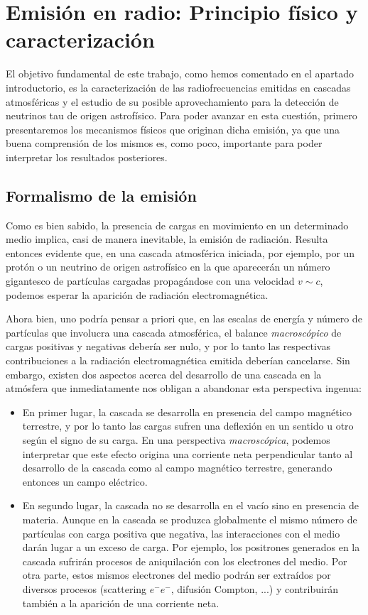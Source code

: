 \documentclass[12 pt, a4paper]{article} %
\numberwithin{equation}{section}
\numberwithin{figure}{section}
\numberwithin{table}{section}
\begin{document}
	\section{Emisión en radio: Principio físico y caracterización}\label{sec3}
	El objetivo fundamental de este trabajo, como hemos comentado en el apartado introductorio, es la caracterización de las radiofrecuencias emitidas en cascadas atmosféricas y el estudio de su posible aprovechamiento para la detección de neutrinos tau de origen astrofísico. Para poder avanzar en esta cuestión, primero presentaremos los mecanismos físicos que originan dicha emisión, ya que una buena comprensión de los mismos es, como poco, importante para poder interpretar los resultados posteriores.
	\subsection{Formalismo de la emisión}\label{sec31}
	Como es bien sabido, la presencia de cargas en movimiento en un determinado medio implica, casi de manera inevitable, la emisión de radiación. Resulta entonces evidente que, en una cascada atmosférica iniciada, por ejemplo, por un protón o un neutrino de origen astrofísico en la que aparecerán un número gigantesco de partículas cargadas propagándose con una velocidad $v\sim c$, podemos esperar la aparición de radiación electromagnética.
	
	Ahora bien, uno podría pensar a priori que, en las escalas de energía y número de partículas que involucra una cascada atmosférica, el balance \textit{macroscópico} de cargas positivas y negativas debería ser nulo, y por lo tanto las respectivas contribuciones a la radiación electromagnética emitida deberían cancelarse. Sin embargo, existen dos aspectos acerca del desarrollo de una cascada en la atmósfera que inmediatamente nos obligan a abandonar esta perspectiva ingenua:
	\begin{itemize}
		\item En primer lugar, la cascada se desarrolla en presencia del campo magnético terrestre, y por lo tanto las cargas sufren una deflexión en un sentido u otro según el signo de su carga. En una perspectiva \textit{macroscópica}, podemos interpretar que este efecto origina una corriente neta perpendicular tanto al desarrollo de la cascada como al campo magnético terrestre, generando entonces un campo eléctrico.
		\item En segundo lugar, la cascada no se desarrolla en el vacío sino en presencia de materia. Aunque en la cascada se produzca globalmente el mismo número de partículas con carga positiva que negativa, las interacciones con el medio darán lugar a un exceso de carga. Por ejemplo, los positrones generados en la cascada sufrirán procesos de aniquilación con los electrones del medio. Por otra parte, estos mismos electrones del medio podrán ser extraídos por diversos procesos (scattering $e^-e^-$, difusión Compton, ...) y contribuirán también a la aparición de una corriente neta. 
	\end{itemize}
\end{document}
